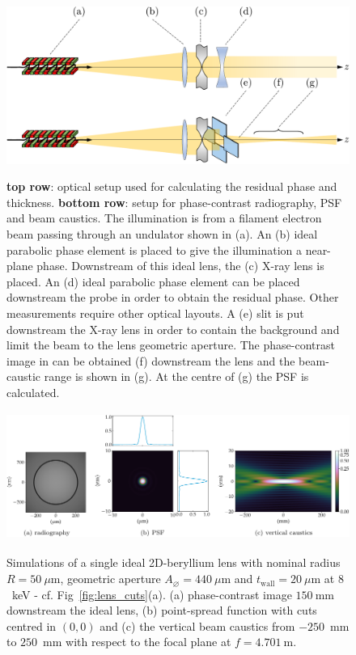 \begin{refsection}
\begin{figure}[t]
    \centering
    {\includegraphics[width=.7\linewidth]{figures/ch04/simulations.pdf}}
    \caption[Optical layout used for modelling imperfections in CRL]{\textbf{top row}: optical setup used for calculating the residual phase and thickness. \textbf{bottom row}: setup for phase-contrast radiography, PSF and beam caustics. The illumination is from a filament electron beam passing through an undulator shown in (a). An (b) ideal parabolic phase element is placed to give the illumination a near-plane phase. Downstream of this ideal lens, the (c) X-ray lens is placed. An (d) ideal parabolic phase element can be placed downstream the probe in order to obtain the residual phase. Other measurements require other optical layouts. A (e) slit is put downstream the X-ray lens in order to contain the background and limit the beam to the lens geometric aperture. The phase-contrast image in can be obtained (f) downstream the lens and the beam-caustic range is shown in (g). At the centre of (g) the PSF is calculated.}
    \label{fig:optical_layouts}
\end{figure}
 \begin{figure}[t]
        \centering
        {\includegraphics[height=4.19cm]{figures/compressed/CRL_ideal.pdf}}
        \caption[The ideal single X-ray lens]{Simulations of a single ideal 2D-beryllium lens with nominal radius $R=50~\mu\text{m}$, geometric aperture $A_{\diameter}=440~\mu\text{m}$ and $t_\text{wall}=20~\mu$m at $8$~keV  - cf. Fig~\ref{fig:lens_cuts}(a). (a) phase-contrast image $150~$mm downstream the ideal lens, (b) point-spread function with cuts centred in $(0,0)$ and (c) the vertical beam caustics from $-250$~mm to $250$~mm with respect to the focal plane at $f=4.701~$m.} \label{fig:ideal_CRL}
\end{figure}


\end{refsection}
